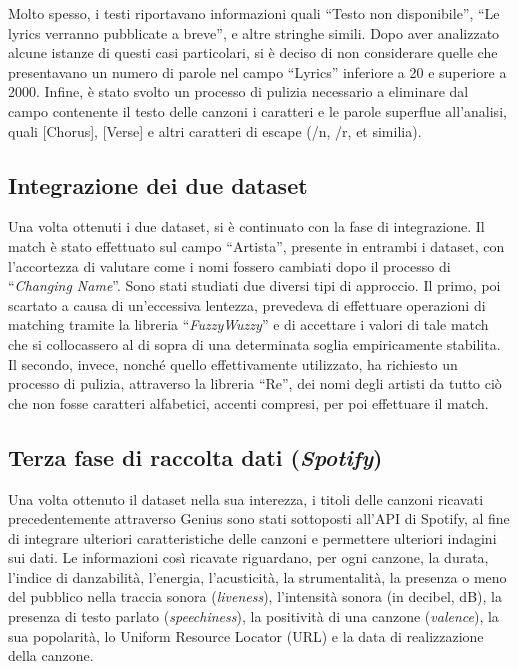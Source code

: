 \documentclass[fleqn,10pt]{SelfArx} %
\begin{document}
Molto spesso, i testi riportavano informazioni quali “Testo non disponibile”, “Le lyrics verranno pubblicate a breve”, e altre stringhe simili. Dopo aver analizzato alcune istanze di questi casi particolari, si è deciso di non considerare quelle che presentavano un numero di parole nel campo “Lyrics” inferiore a 20 e superiore a 2000.
Infine, è stato svolto un processo di pulizia necessario a eliminare dal campo contenente il testo delle canzoni i caratteri e le parole superflue all’analisi, quali [Chorus], [Verse] e altri caratteri di escape (/n, /r, et similia).

\subsection{Integrazione dei due dataset}

Una volta ottenuti i due dataset, si è continuato con la fase di integrazione.
Il match è stato effettuato sul campo “Artista”, presente in entrambi i dataset, con l’accortezza di valutare come i nomi fossero cambiati dopo il processo di “\textit{Changing Name}”.
Sono stati studiati due diversi tipi di approccio. Il primo, poi scartato a causa di un'eccessiva lentezza, prevedeva di effettuare operazioni di matching tramite la libreria “\textit{FuzzyWuzzy}” e di accettare i valori di tale match che si collocassero al di sopra di una determinata soglia empiricamente stabilita. Il secondo, invece, nonché quello effettivamente utilizzato, ha richiesto un processo di pulizia, attraverso la libreria “Re”, dei nomi degli artisti da tutto ciò che non fosse caratteri alfabetici, accenti compresi, per poi effettuare il match.


\subsection{Terza fase di raccolta dati (\textit{Spotify})}

Una volta ottenuto il dataset nella sua interezza, i titoli delle canzoni ricavati precedentemente attraverso Genius sono stati sottoposti all’API di Spotify, al fine di integrare ulteriori caratteristiche delle canzoni e permettere ulteriori indagini sui dati.
Le informazioni così ricavate riguardano, per ogni canzone, la durata, l’indice di danzabilità, l’energia, l’acusticità, la strumentalità, la presenza o meno del pubblico nella traccia sonora (\textit{liveness}), l’intensità sonora (in decibel, dB), la presenza di testo parlato (\textit{speechiness}), la positività di una canzone (\textit{valence}), la sua popolarità, lo Uniform Resource Locator (URL) e la data di realizzazione della canzone.
\end{document}
